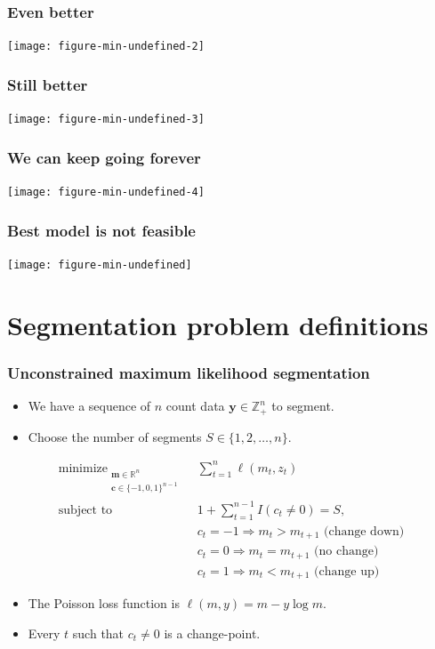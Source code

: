 \documentclass{beamer}
\DeclareMathOperator*{\minimize}{minimize}
\newcommand{\RR}{\mathbb R}
\newcommand{\ZZ}{\mathbb Z}
\begin{document}
\begin{frame}
  \frametitle{Even better}
  \texttt{[image: figure-min-undefined-2]}
\end{frame}

\begin{frame}
  \frametitle{Still better}
  \texttt{[image: figure-min-undefined-3]}
\end{frame}

\begin{frame}
  \frametitle{We can keep going forever}
  \texttt{[image: figure-min-undefined-4]}
\end{frame}

\begin{frame}
  \frametitle{Best model is not feasible}
  \texttt{[image: figure-min-undefined]}
\end{frame}
 
\section*{Segmentation problem definitions}

\begin{frame}
  \frametitle{Unconstrained maximum likelihood segmentation}
  \begin{itemize}
  \item We have a sequence of $n$ count data $\mathbf y\in\ZZ_+^n$ to
    segment. 
  \item Choose the number of segments $S\in\{1, 2, \dots, n\}$.
  \end{itemize}
\begin{align*}
  \minimize_{\substack{
  \mathbf m\in\RR^{n}
\\
  \mathbf c\in\{-1,0,1\}^{n-1}
  }} &\ \ 
    \sum_{t=1}^n \ell( m_t,  z_t) 
\\
    \text{subject to} &\ \  1+\sum_{t=1}^{n-1} I(c_t \neq 0) = S, 
\nonumber\\
& \ \ c_t = -1 \Rightarrow m_{t} > m_{t+1} \text{ (change down)}
\nonumber\\
& \ \ c_t = 0 \Rightarrow m_{t} = m_{t+1}  \text{ (no change)}
\nonumber\\
& \ \ c_t = 1 \Rightarrow m_{t} < m_{t+1} \text{ (change up)}
\nonumber
\end{align*}
\begin{itemize}
\item The Poisson loss function is  $\ell( m,  y)= m - y \log m$.
\item Every $t$ such that $c_t \neq 0$ is a
change-point.
\end{itemize}

\end{frame}
\end{document}

